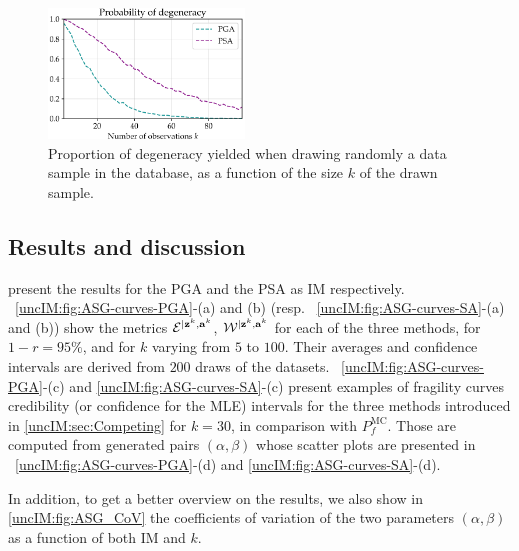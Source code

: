     \begin{figure}[!h]
        \centering
        \includegraphics[width=5.2cm]{figures/uncIM/degeneracy_proba.pdf}
        \caption{Proportion of degeneracy yielded when drawing randomly a data sample in the database, as a function of the size $k$ of the drawn sample.}\label{uncIM:fig:degeneracy-prob}
    \end{figure}
    
  
    
\subsection{Results and discussion}    
    
    present the results for the PGA and the PSA as IM respectively. ~\ref{uncIM:fig:ASG-curves-PGA}-(a) and (b) (resp. ~\ref{uncIM:fig:ASG-curves-SA}-(a) and (b)) show the metrics  $\mathcal{E}^{|\mathbf{z}^{k},\mathbf{a}^{k}}$, $\mathcal{W}^{|\mathbf{z}^{k},\mathbf{a}^{k}}$ for each of the three methods, for $1-r=95\%$, and for $k$ varying from $5$ to $100$. Their averages and confidence intervals are derived from $200$ draws of the datasets. ~\ref{uncIM:fig:ASG-curves-PGA}-(c) and \ref{uncIM:fig:ASG-curves-SA}-(c) present examples of fragility curves credibility (or confidence for the MLE) intervals for the three methods introduced in \cref{uncIM:sec:Competing} for $k = 30$, in comparison with $P_f^{\mathrm{MC}}$. 
   Those are computed from generated pairs $(\alpha,\beta)$ whose scatter plots are presented in ~\ref{uncIM:fig:ASG-curves-PGA}-(d) and \ref{uncIM:fig:ASG-curves-SA}-(d).
   
   In addition, to get a better overview on the results, we also show in \cref{uncIM:fig:ASG_CoV} the coefficients of variation of the two parameters $(\alpha , \beta)$ as a function of both IM and $k$.
   
